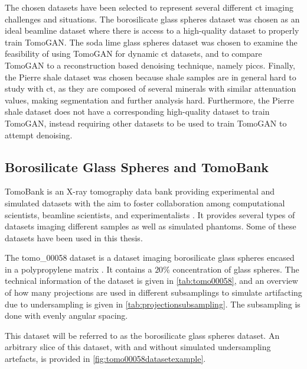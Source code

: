 The chosen datasets have been selected to represent several different \gls{ct} imaging challenges and situations. The borosilicate glass spheres dataset was chosen as an ideal beamline dataset where there is access to a high-quality dataset to properly train TomoGAN. The soda lime glass spheres dataset was chosen to examine the feasibility of using TomoGAN for dynamic \gls{ct} datasets, and to compare TomoGAN to a reconstruction based denoising technique, namely \gls{piccs}. Finally, the Pierre shale dataset was chosen because shale samples are in general hard to study with \gls{ct}, as they are composed of several minerals with similar attenuation values, making segmentation and further analysis hard. Furthermore, the Pierre shale dataset does not have a corresponding high-quality dataset to train TomoGAN, instead requiring other datasets to be used to train TomoGAN to attempt denoising. 

\subsection{Borosilicate Glass Spheres and TomoBank}
\label{sec:method:datasets:tomo00058}
TomoBank is an X-ray tomography data bank providing experimental and simulated datasets with the aim to foster collaboration among computational scientists, beamline scientists, and experimentalists \cite{TomoBank}. It provides several types of datasets imaging different samples as well as simulated phantoms. Some of these datasets have been used in this thesis.

The tomo\_00058 dataset is a dataset imaging borosilicate glass spheres encased in a polypropylene matrix \cite{datasetglassspheres}. It contains a $20\%$ concentration of glass spheres. The technical information of the dataset is given in \cref{tab:tomo00058}, and an overview of how many projections are used in different subsamplings to simulate artifacting due to undersampling is given in \cref{tab:projectionsubsampling}. The subsampling is done with evenly angular spacing. 

This dataset will be referred to as the borosilicate glass spheres dataset. An arbitrary slice of this dataset, with and without simulated undersampling artefacts, is provided in \cref{fig:tomo00058datasetexample}. 

